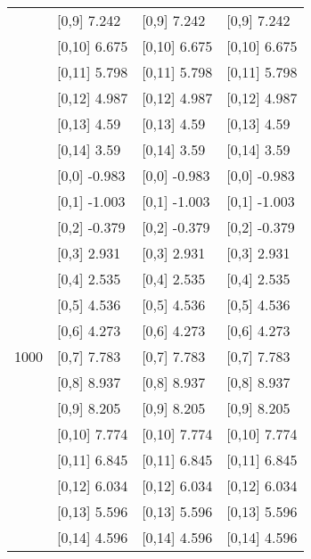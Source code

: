 \begin{table}
\begin{tabular}[t]{llll}
 & {}[0,9] 7.242 & {}[0,9] 7.242 & {}[0,9] 7.242\\
\addlinespace
 & {}[0,10] 6.675 & {}[0,10] 6.675 & {}[0,10] 6.675\\
 & {}[0,11] 5.798 & {}[0,11] 5.798 & {}[0,11] 5.798\\
 & {}[0,12] 4.987 & {}[0,12] 4.987 & {}[0,12] 4.987\\
 & {}[0,13] 4.59 & {}[0,13] 4.59 & {}[0,13] 4.59\\
 & {}[0,14] 3.59 & {}[0,14] 3.59 & {}[0,14] 3.59\\
\addlinespace
 & {}[0,0] -0.983 & {}[0,0] -0.983 & {}[0,0] -0.983\\
 & {}[0,1] -1.003 & {}[0,1] -1.003 & {}[0,1] -1.003\\
 & {}[0,2] -0.379 & {}[0,2] -0.379 & {}[0,2] -0.379\\
 & {}[0,3] 2.931 & {}[0,3] 2.931 & {}[0,3] 2.931\\
 & {}[0,4] 2.535 & {}[0,4] 2.535 & {}[0,4] 2.535\\
\addlinespace
 & {}[0,5] 4.536 & {}[0,5] 4.536 & {}[0,5] 4.536\\
 & {}[0,6] 4.273 & {}[0,6] 4.273 & {}[0,6] 4.273\\
1000 & {}[0,7] 7.783 & {}[0,7] 7.783 & {}[0,7] 7.783\\
 & {}[0,8] 8.937 & {}[0,8] 8.937 & {}[0,8] 8.937\\
 & {}[0,9] 8.205 & {}[0,9] 8.205 & {}[0,9] 8.205\\
\addlinespace
 & {}[0,10] 7.774 & {}[0,10] 7.774 & {}[0,10] 7.774\\
 & {}[0,11] 6.845 & {}[0,11] 6.845 & {}[0,11] 6.845\\
 & {}[0,12] 6.034 & {}[0,12] 6.034 & {}[0,12] 6.034\\
 & {}[0,13] 5.596 & {}[0,13] 5.596 & {}[0,13] 5.596\\
 & {}[0,14] 4.596 & {}[0,14] 4.596 & {}[0,14] 4.596\\
\bottomrule
\end{tabular}
\end{table}
